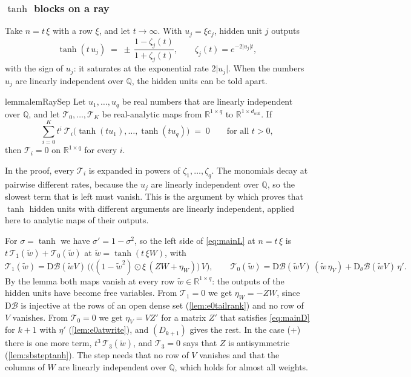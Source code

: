 \documentclass[10pt]{article}
\theoremstyle{definition}
\theoremstyle{remark}
\newcommand{\R}{\mathbb{R}}
\newcommand{\Der}{\mathrm{D}}
\begin{document}
\subsubsection*{\texorpdfstring{$\tanh$}{tanh} blocks on a ray}

Take $n = t\,\xi$ with a row $\xi$, and let $t \to \infty$. With $u_j = \xi c_j$, hidden unit $j$ outputs
\[
\tanh(t\,u_j) \;=\; \pm\,\frac{1 - \zeta_j(t)}{1 + \zeta_j(t)}, \qquad \zeta_j(t) = e^{-2\lvert u_j\rvert t},
\]
with the sign of $u_j$: it saturates at the exponential rate $2\lvert u_j\rvert$. When the numbers $u_j$ are linearly independent over $\mathbb Q$, the hidden units can be told apart.

\begin{restatable}{lemma}{lemRaySep}\label{lem:raysep}
Let $u_1, \dots, u_q$ be real numbers that are linearly independent over $\mathbb Q$, and let $\mathcal T_0, \dots, \mathcal T_K$ be real-analytic maps from $\R^{1\times q}$ to $\R^{1\times d_{\mathrm{out}}}$. If
\[
\sum_{i=0}^{K} t^i\ \mathcal T_i\big(\tanh(tu_1), \dots, \tanh(tu_q)\big) \;=\; 0 \qquad\text{for all } t > 0,
\]
then $\mathcal T_i = 0$ on $\R^{1\times q}$ for every $i$.
\end{restatable}

In the proof, every $\mathcal T_i$ is expanded in powers of $\zeta_1, \dots, \zeta_q$. The monomials decay at pairwise different rates, because the $u_j$ are linearly independent over $\mathbb Q$, so the slowest term that is left must vanish. This is the argument by which \citet[Lemma~3.1]{sussmann1992} proves that $\tanh$ hidden units with different arguments are linearly independent, applied here to analytic maps of their outputs.

For $\sigma = \tanh$ we have $\sigma' = 1 - \sigma^2$, so the left side of \eqref{eq:mainL} at $n = t\,\xi$ is $t\,\mathcal T_1(\tilde w) + \mathcal T_0(\tilde w)$ at $\tilde w = \tanh(t\,\xi W)$, with
\[
\mathcal T_1(\tilde w) = \Der\mathcal B(\tilde wV)\,\Big(\big((1 - \tilde w^2)\odot\xi\,(ZW + \eta_W)\big)\,V\Big), \qquad \mathcal T_0(\tilde w) = \Der\mathcal B(\tilde wV)\,(\tilde w\,\eta_V) + \Der_\theta\mathcal B(\tilde wV)\,\eta' .
\]
By the lemma both maps vanish at every row $\tilde w \in \R^{1\times q}$: the outputs of the hidden units have become free variables. From $\mathcal T_1 = 0$ we get $\eta_W = -ZW$, since $\Der\mathcal B$ is injective at the rows of an open dense set (\cref{lem:e0tailrank}) and no row of $V$ vanishes. From $\mathcal T_0 = 0$ we get $\eta_V = VZ'$ for a matrix $Z'$ that satisfies \eqref{eq:mainD} for $k+1$ with $\eta'$ (\cref{lem:e0atwrite}), and $(D_{k+1})$ gives the rest. In the case (+) there is one more term, $t^3\,\mathcal T_3(\tilde w)$, and $\mathcal T_3 = 0$ says that $Z$ is antisymmetric (\cref{lem:sbsteptanh}). The step needs that no row of $V$ vanishes and that the columns of $W$ are linearly independent over $\mathbb Q$, which holds for almost all weights.
\end{document}
